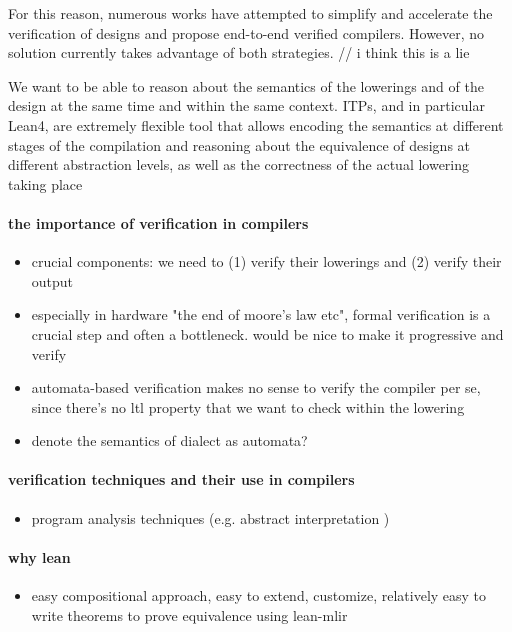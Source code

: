\documentclass[]{article}
\begin{document}
For this reason, numerous works have attempted to simplify and accelerate the verification of designs and propose end-to-end verified compilers.
However, no solution currently takes advantage of both strategies. // i think this is a lie

We want to be able to reason about the semantics of the lowerings and of the design at the same time and within the same context. 
ITPs, and in particular Lean4, are extremely flexible tool that allows encoding the semantics at different stages of the compilation and reasoning about the equivalence of designs 
at different abstraction levels, as well as the correctness of the actual lowering taking place 


















\paragraph{the importance of verification in compilers}
\begin{itemize}
    \item crucial components: we need to (1) verify their lowerings and (2) verify their output 
    \item especially in hardware "the end of moore's law etc", formal verification is a crucial step and often a bottleneck. would be nice to make it progressive and verify
    \item automata-based verification makes no sense to verify the compiler per se, since there's no ltl property that we want to check within the lowering 
    \item denote the semantics of dialect as automata? 
\end{itemize}

\paragraph{verification techniques and their use in compilers}
\begin{itemize}
    \item program analysis techniques (e.g. abstract interpretation )
\end{itemize}

\paragraph{why lean}
\begin{itemize}
    \item easy compositional approach, easy to extend, customize, relatively easy to write theorems to prove equivalence using lean-mlir 
\end{itemize}
\end{document}
